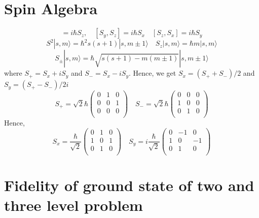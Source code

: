 \documentclass[11pt,a4paper]{article}
\begin{document}
\section{Spin Algebra}\label{sec.spin_alegbra}
\begin{equation}
[S_x, S_y]=i \hbar S_z, \quad [S_y, S_z]=i \hbar S_x \quad [S_z, S_x]=i \hbar S_y
\end{equation}
\begin{equation}
S^2|s ,m \rangle = \hbar^2 s(s+1)|s ,m\pm 1\rangle  \quad S_z|s ,m \rangle = \hbar m |s ,m \rangle
\end{equation}
\begin{equation}
S_{\pm}|s, m\rangle = \hbar\sqrt{s(s+1)-m(m \pm 1)}|s,m \pm 1\rangle
\end{equation}
where $S_+ = S_x + iS_y$ and $S_- = S_x - iS_y $. Hence, we get $S_x = (S_+ + S_-)/2$ and $S_y = (S_+ - S_-)/2i $
\begin{equation}
S_+= \sqrt{2} \hbar\begin{pmatrix}
0 & 1 & 0\\
0 & 0 & 1\\
0 & 0 & 0\\
\end{pmatrix}
\quad
S_-=\sqrt{2} \hbar 
\begin{pmatrix}
0 & 0 & 0\\
1 & 0 & 0\\
0 & 1 & 0\\
\end{pmatrix}
\end{equation}
Hence, \begin{equation}
S_x= \frac{\hbar}{\sqrt{2} }
\begin{pmatrix}
0 & 1 & 0\\
1 & 0 & 1\\
0 & 1 & 0\\
\end{pmatrix} \quad
S_y=  i \frac{\hbar}{\sqrt{2} }
\begin{pmatrix}
0 & -1 & 0\\
1 & 0 & -1\\
0 & 1 & 0\\
\end{pmatrix}
\end{equation}

\section{Fidelity of ground state of two and three level problem}
\end{document}
